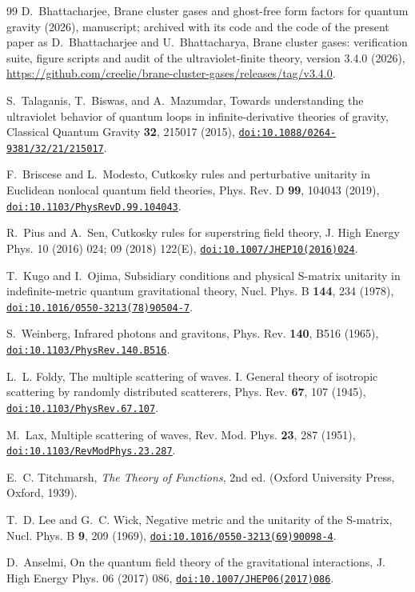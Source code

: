 \documentclass[a4paper,11pt]{article}
\newcommand{\doilink}[1]{\href{https://doi.org/#1}{\nolinkurl{doi:#1}}}
\begin{document}
\begin{thebibliography}{99}
D.~Bhattacharjee, Brane cluster gases and ghost-free form factors for quantum gravity (2026), manuscript; archived with its code and the code of the present paper as D.~Bhattacharjee and U.~Bhattacharya, Brane cluster gases: verification suite, figure scripts and audit of the ultraviolet-finite theory, version 3.4.0 (2026), \url{https://github.com/creelie/brane-cluster-gases/releases/tag/v3.4.0}.

S.~Talaganis, T.~Biswas, and A.~Mazumdar, Towards understanding the ultraviolet behavior of quantum loops in infinite-derivative theories of gravity, Classical Quantum Gravity \textbf{32}, 215017 (2015), \doilink{10.1088/0264-9381/32/21/215017}.

F.~Briscese and L.~Modesto, Cutkosky rules and perturbative unitarity in Euclidean nonlocal quantum field theories, Phys. Rev. D \textbf{99}, 104043 (2019), \doilink{10.1103/PhysRevD.99.104043}.

R.~Pius and A.~Sen, Cutkosky rules for superstring field theory, J. High Energy Phys. 10 (2016) 024; 09 (2018) 122(E), \doilink{10.1007/JHEP10(2016)024}.

T.~Kugo and I.~Ojima, Subsidiary conditions and physical S-matrix unitarity in indefinite-metric quantum gravitational theory, Nucl. Phys. B \textbf{144}, 234 (1978), \doilink{10.1016/0550-3213(78)90504-7}.

S.~Weinberg, Infrared photons and gravitons, Phys. Rev. \textbf{140}, B516 (1965), \doilink{10.1103/PhysRev.140.B516}.

L.~L. Foldy, The multiple scattering of waves. I. General theory of isotropic scattering by randomly distributed scatterers, Phys. Rev. \textbf{67}, 107 (1945), \doilink{10.1103/PhysRev.67.107}.

M.~Lax, Multiple scattering of waves, Rev. Mod. Phys. \textbf{23}, 287 (1951), \doilink{10.1103/RevModPhys.23.287}.

E.~C. Titchmarsh, \emph{The Theory of Functions}, 2nd ed. (Oxford University Press, Oxford, 1939).

T.~D. Lee and G.~C. Wick, Negative metric and the unitarity of the S-matrix, Nucl. Phys. B \textbf{9}, 209 (1969), \doilink{10.1016/0550-3213(69)90098-4}.

D.~Anselmi, On the quantum field theory of the gravitational interactions, J. High Energy Phys. 06 (2017) 086, \doilink{10.1007/JHEP06(2017)086}.


\end{thebibliography}
\end{document}
